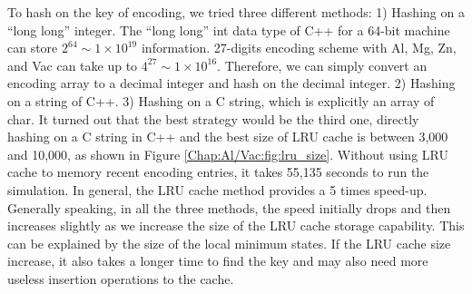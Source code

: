 To hash on the key of encoding, we tried three different methods: 1) Hashing on a ``long long'' integer. The ``long long'' int data type of C++ for a 64-bit machine can store $2^{64} \sim 1\times10^{19}$ information. 27-digits encoding scheme with Al, Mg, Zn, and Vac can take up to $4^{27} \sim 1\times10^{16}$. Therefore, we can simply convert an encoding array to a decimal integer and hash on the decimal integer. 2) Hashing on a string of C++. 3) Hashing on a C string, which is explicitly an array of char. It turned out that the best strategy would be the third one, directly hashing on a C string in C++ and the best size of \ac{LRU} cache is between 3,000 and 10,000, as shown in Figure \ref{Chap:Al/Vac:fig:lru_size}. Without using \ac{LRU} cache to memory recent encoding entries, it takes 55,135 seconds to run the simulation. In general, the \ac{LRU} cache method provides a 5 times speed-up. Generally speaking, in all the three methods, the speed initially drops and then increases slightly as we increase the size of the \ac{LRU} cache storage capability. This can be explained by the size of the local minimum states. If the \ac{LRU} cache size increase, it also takes a longer time to find the key and may also need more useless insertion operations to the cache.

